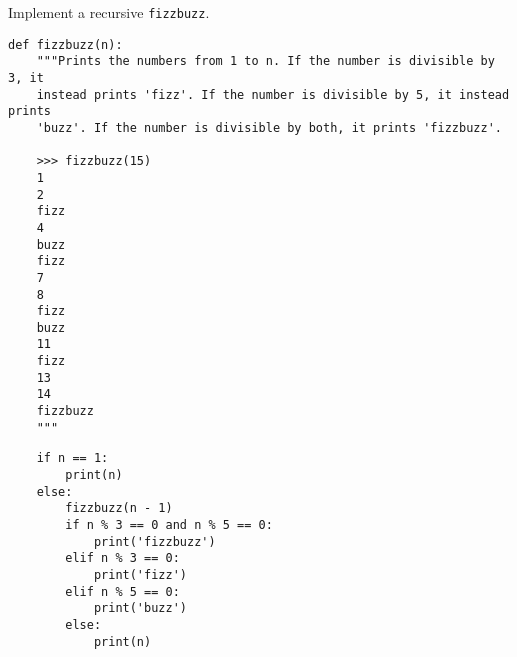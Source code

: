 \begin{blocksection}
\question Implement a recursive \lstinline$fizzbuzz$.

\begin{lstlisting}
def fizzbuzz(n):
    """Prints the numbers from 1 to n. If the number is divisible by 3, it
    instead prints 'fizz'. If the number is divisible by 5, it instead prints
    'buzz'. If the number is divisible by both, it prints 'fizzbuzz'.

    >>> fizzbuzz(15)
    1
    2
    fizz
    4
    buzz
    fizz
    7
    8
    fizz
    buzz
    11
    fizz
    13
    14
    fizzbuzz
    """
\end{lstlisting}

\begin{solution}[1.5in]
\begin{lstlisting}
    if n == 1:
        print(n)
    else:
        fizzbuzz(n - 1)
        if n % 3 == 0 and n % 5 == 0:
            print('fizzbuzz')
        elif n % 3 == 0:
            print('fizz')
        elif n % 5 == 0:
            print('buzz')
        else:
            print(n)
\end{lstlisting}
\end{solution}
\end{blocksection}
